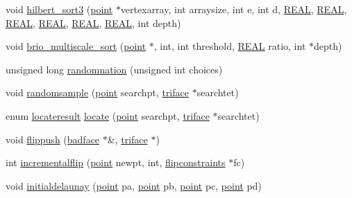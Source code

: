 \begin{DoxyCompactItemize}
\item 
void \hyperlink{classtetgenmesh_a49edbd210b6c45754eca98046b0ef477}{hilbert\-\_\-sort3} (\hyperlink{classtetgenmesh_ace3fb4f80389185b7c9b18ab69a3dea2}{point} $\ast$vertexarray, int arraysize, int e, int d, \hyperlink{tetgen_8h_a4b654506f18b8bfd61ad2a29a7e38c25}{R\-E\-A\-L}, \hyperlink{tetgen_8h_a4b654506f18b8bfd61ad2a29a7e38c25}{R\-E\-A\-L}, \hyperlink{tetgen_8h_a4b654506f18b8bfd61ad2a29a7e38c25}{R\-E\-A\-L}, \hyperlink{tetgen_8h_a4b654506f18b8bfd61ad2a29a7e38c25}{R\-E\-A\-L}, \hyperlink{tetgen_8h_a4b654506f18b8bfd61ad2a29a7e38c25}{R\-E\-A\-L}, \hyperlink{tetgen_8h_a4b654506f18b8bfd61ad2a29a7e38c25}{R\-E\-A\-L}, int depth)
\item 
void \hyperlink{classtetgenmesh_a3f09dd9fb2d975c75397a92aa6128565}{brio\-\_\-multiscale\-\_\-sort} (\hyperlink{classtetgenmesh_ace3fb4f80389185b7c9b18ab69a3dea2}{point} $\ast$, int, int threshold, \hyperlink{tetgen_8h_a4b654506f18b8bfd61ad2a29a7e38c25}{R\-E\-A\-L} ratio, int $\ast$depth)
\item 
unsigned long \hyperlink{classtetgenmesh_a0ae35b219eb4a0d1e0c14f9759cd6563}{randomnation} (unsigned int choices)
\item 
void \hyperlink{classtetgenmesh_aa05e91020e6e60c4bc589571c64ae646}{randomsample} (\hyperlink{classtetgenmesh_ace3fb4f80389185b7c9b18ab69a3dea2}{point} searchpt, \hyperlink{classtetgenmesh_1_1triface}{triface} $\ast$searchtet)
\item 
enum \hyperlink{classtetgenmesh_a1d02bed7b59566d57b896776d78a6b25}{locateresult} \hyperlink{classtetgenmesh_a909ae9072f70495a9dbb1ee6f0e9f151}{locate} (\hyperlink{classtetgenmesh_ace3fb4f80389185b7c9b18ab69a3dea2}{point} searchpt, \hyperlink{classtetgenmesh_1_1triface}{triface} $\ast$searchtet)
\item 
void \hyperlink{classtetgenmesh_a5ffeb14717bdf9867aa29a9d9487013f}{flippush} (\hyperlink{classtetgenmesh_1_1badface}{badface} $\ast$\&, \hyperlink{classtetgenmesh_1_1triface}{triface} $\ast$)
\item 
int \hyperlink{classtetgenmesh_a2388d9669cc9bb2a68943633bd5148ef}{incrementalflip} (\hyperlink{classtetgenmesh_ace3fb4f80389185b7c9b18ab69a3dea2}{point} newpt, int, \hyperlink{classtetgenmesh_1_1flipconstraints}{flipconstraints} $\ast$fc)
\item 
void \hyperlink{classtetgenmesh_a9b2f957a884b39c4d93c8695fa4b59d7}{initialdelaunay} (\hyperlink{classtetgenmesh_ace3fb4f80389185b7c9b18ab69a3dea2}{point} pa, \hyperlink{classtetgenmesh_ace3fb4f80389185b7c9b18ab69a3dea2}{point} pb, \hyperlink{classtetgenmesh_ace3fb4f80389185b7c9b18ab69a3dea2}{point} pc, \hyperlink{classtetgenmesh_ace3fb4f80389185b7c9b18ab69a3dea2}{point} pd)

\end{DoxyCompactItemize}
